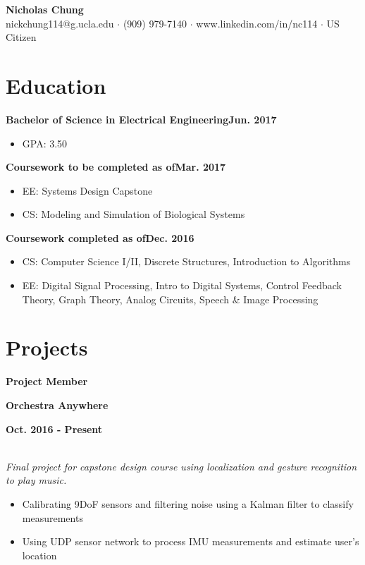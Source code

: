 \documentclass[12pt]{article}
\newcommand\textbox[1]{\parbox{.333\textwidth}{#1}}
\newcommand{\textlcr}[3]{\textbox{\textbf{#1}\hfill}\textbox{\hfil \textbf{#2}\hfil}\textbox{\hfill \textbf{#3}}}
\begin{document}
\begin{center}
	\textbf{\LARGE Nicholas Chung} \\ \vspace{.5ex}
	nickchung114@g.ucla.edu $\cdot$ (909) 979-7140 $\cdot$ www.linkedin.com/in/nc114 $\cdot$ US Citizen
\end{center}

\vspace{-8pt}
\smallskip
\section*{Education}
\vspace*{-1em}\makebox[\linewidth]{\rule{\textwidth}{0.4pt}}

\textbf{Bachelor of Science in Electrical Engineering}\hfill\textbf{Jun. 2017}
\begin{itemize}
\item GPA: 3.50
\end{itemize}

\textbf{Coursework to be completed as of}\hfill\textbf{Mar. 2017}
\begin{itemize}
\item EE: Systems Design Capstone
\item CS: Modeling and Simulation of Biological Systems
\end{itemize}

\textbf{Coursework completed as of}\hfill\textbf{Dec. 2016}
\begin{itemize}
\item CS: Computer Science I/II, Discrete Structures, Introduction to Algorithms
\item EE: Digital Signal Processing, Intro to Digital Systems, Control Feedback Theory, Graph Theory, Analog Circuits,  Speech \& Image Processing
\end{itemize}

\section*{Projects}
\vspace*{-1em}\makebox[\linewidth]{\rule{\textwidth}{0.4pt}}

\textlcr{Project Member}{Orchestra Anywhere}{Oct. 2016 - Present}
\\ \textit{Final project for capstone design course using localization and gesture recognition to play music.}
\begin{itemize}
\item Calibrating 9DoF sensors and filtering noise using a Kalman filter to classify measurements
\item Using UDP sensor network to process IMU measurements and estimate user's location
\end{itemize}
\end{document}
